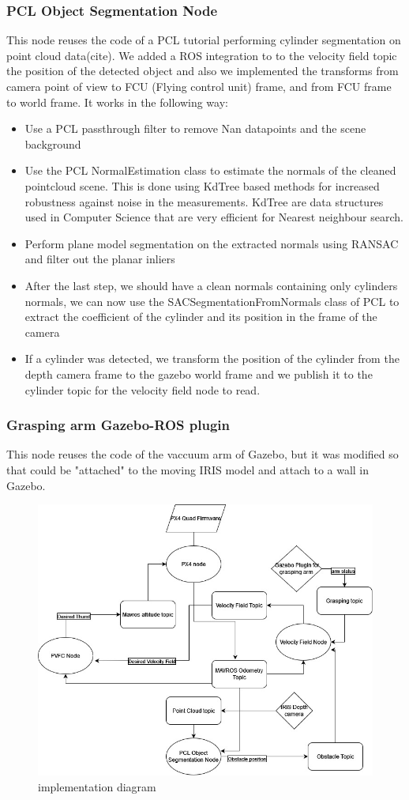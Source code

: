 \subsubsection{PCL Object Segmentation Node}
This node reuses the code of a PCL tutorial performing cylinder segmentation on point cloud data(cite). 
We added a ROS integration to to the velocity field topic the position of the detected object and also we implemented the transforms from camera point of view to FCU (Flying control unit) frame, and from FCU frame to world frame. 
It works in the following way:
\begin{itemize}
    \item Use a PCL passthrough filter to remove Nan datapoints and the scene background
    \item Use the PCL NormalEstimation class to estimate the normals of the cleaned pointcloud scene. This is done using KdTree based methods for increased robustness against noise in the measurements. KdTree are data structures used in Computer Science that are very efficient for Nearest neighbour search.
    \item Perform plane model segmentation on the extracted normals using RANSAC and filter out the planar inliers
    \item After the last step, we should have a clean normals containing only cylinders normals, we can now use the SACSegmentationFromNormals class of PCL to extract the coefficient of the cylinder and its position in the frame of the camera
    \item If a cylinder was detected, we transform the position of the cylinder from the depth camera frame to the gazebo world frame and we publish it to the cylinder topic for the velocity field node to read. 
\end{itemize}
\subsubsection{Grasping arm Gazebo-ROS plugin}    
This node reuses the code of the vaccuum arm of Gazebo, but it was modified so that could be "attached" to the moving IRIS model and attach to a wall in Gazebo. 

\begin{figure}[h!]
    \centering
    \includegraphics[width=\linewidth]{Images/implementation diagram.jpg}
    \caption{implementation diagram}
    \label{fig:implementationdiagram}
\end{figure}

